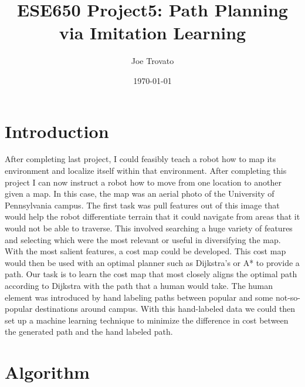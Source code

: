 \documentclass{article}
\begin{document}
\title{ESE650 Project5: Path Planning via Imitation Learning}
\author{Joe Trovato}
\date{\today}
\maketitle
\setlength{\parindent}{10ex}

\section{Introduction}
\par
After completing last project, I could feasibly teach a robot how to map its environment and localize itself within that environment. After completing this project I can now instruct a robot how to move from one location to another given a map. In this case, the map was an aerial photo of the University of Pennsylvania campus. The first task was pull features out of this image that would help the robot differentiate terrain that it could navigate from areas that it would not be able to traverse. This involved searching a huge variety of features and selecting which were the most relevant or useful in diversifying the map. With the most salient features, a cost map could be developed. This cost map would then be used with an optimal planner such as Dijkstra's or A* to provide a path. Our task is to learn the cost map that most closely aligns the optimal path according to Dijkstra with the path that a human would take. The human element was introduced by hand labeling paths between popular and some not-so-popular destinations around campus. With this hand-labeled data we could then set up a machine learning technique to minimize the difference in cost between the generated path and the hand labeled path. 

\section{Algorithm}
\end{document}
